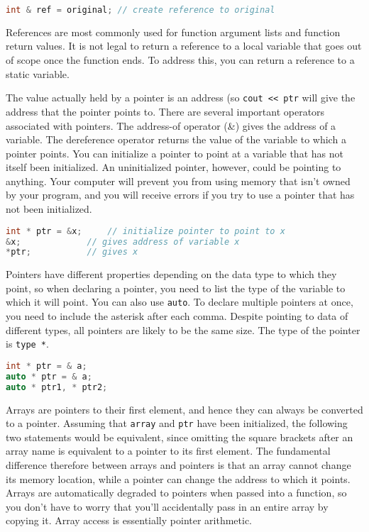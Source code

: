 \documentclass[10pt]{article}
\begin{document}
\begin{lstlisting}[language=C++]
int & ref = original; // create reference to original
\end{lstlisting}

References are most commonly used for function argument lists and function return values. It is not legal to return a reference to a local variable that goes out of scope once the function ends. To address this, you can return a reference to a static variable.

The value actually held by a pointer is an address (so \texttt{cout << ptr} will give the address that the pointer points to. There are several important operators associated with pointers. The address-of operator (\&) gives the address of a variable. The dereference operator returns the value of the variable to which a pointer points. You can initialize a pointer to point at a variable that has not itself been initialized. An uninitialized pointer, however, could be pointing to anything. Your computer will prevent you from using memory that isn't owned by your program, and you will receive errors if you try to use a pointer that has not been initialized.

\begin{lstlisting}[language=C++]
int * ptr = &x; 	// initialize pointer to point to x
&x; 			// gives address of variable x
*ptr; 			// gives x
\end{lstlisting}

Pointers have different properties depending on the data type to which they point, so when declaring a pointer, you need to list the type of the variable to which it will point. You can also use \texttt{auto}. To declare multiple pointers at once, you need to include the asterisk after each comma. Despite pointing to data of different types, all pointers are likely to be the same size. The type of the pointer is \texttt{type *}. 

\begin{lstlisting}[language=C++]
int * ptr = & a;
auto * ptr = & a;
auto * ptr1, * ptr2;
\end{lstlisting}

Arrays are pointers to their first element, and hence they can always be converted to a pointer. Assuming that \texttt{array} and \texttt{ptr} have been initialized, the following two statements would be equivalent, since omitting the square brackets after an array name is equivalent to a pointer to its first element. The fundamental difference therefore between arrays and pointers is that an array cannot change its memory location, while a pointer can change the address to which it points. Arrays are automatically degraded to pointers when passed into a function, so you don't have to worry that you'll accidentally pass in an entire array by copying it. Array access is essentially pointer arithmetic.
\end{document}
